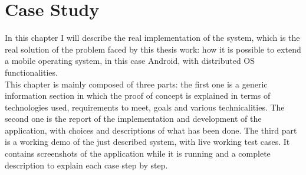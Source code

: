 %
%
\chapter{Case Study}
%
\label{cap:proofofconcept}
%
In this chapter I will describe the real implementation of the system, which is the real solution of the problem faced by this thesis work: how it is possible to extend a mobile operating system, in this case Android, with distributed OS functionalities.\\
This chapter is mainly composed of three parts: the first one is a generic information
section in which the proof of concept is explained in terms of technologies
used, requirements to meet, goals and various technicalities. The second one
is the report of the implementation and development of the application, with
choices and descriptions of what has been done. The third part is a working demo of the
just described system, with live working test cases. It contains screenshots of the
application while it is running and a complete description to explain each case
step by step.

